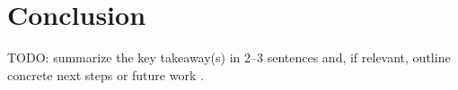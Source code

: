 \section{Conclusion}
\label{sec:conclusion}

TODO: summarize the key takeaway(s) in 2--3 sentences and, if relevant,
outline concrete next steps or future work \citep{example2024}.

